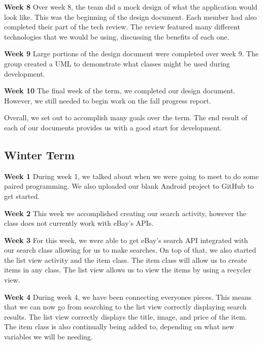 \documentclass[journal,compsoc, 10pt, draftclsnofoot, onecolumn]{IEEEtran}
\begin{document}
\textbf{Week 8}\newline
Over week 8, the team did a mock design of what the application would look like. 
This was the beginning of the design document. Each member had also completed 
their part of the tech review. The review featured many different technologies that 
we would be using, discussing the benefits of each one. \newline

\textbf{Week 9}\newline
Large portions of the design document were completed over week 9. The group 
created a UML to demonstrate what classes might be used during development. 
\newline

\textbf{Week 10}\newline
The final week of the term, we completed our design document. However, we still 
needed to begin work on the fall progress report. \newline

Overall, we set out to accomplish many goals over the term. The end result of 
each of our documents provides us with a good start for development. 

\subsection{Winter Term}
\textbf{Week 1}\newline
During week 1, we talked about when we were going to meet to do some paired 
programming. We also uploaded our blank Android project to GitHub to get 
started. \newline

\textbf{Week 2}\newline
This week we accomplished creating our search activity, however the class does 
not currently work with eBay's APIs. \newline

\textbf{Week 3}\newline
For this week, we were able to get eBay's search API integrated with our 
search class allowing for us to make searches. On top of that, we also started 
the list view activity and the item class. The item class will allow us to create 
items in any class. The list view allows us to view the items by using a recycler 
view.\newline

\textbf{Week 4}\newline
During week 4, we have been connecting everyones pieces. This means that we 
can now go from searching to the list view correctly displaying search results. 
The list view correctly displays the title, image, and price of the item. The 
item class is also continually being added to, depending on what new variables
we will be needing. \newline
\end{document}
